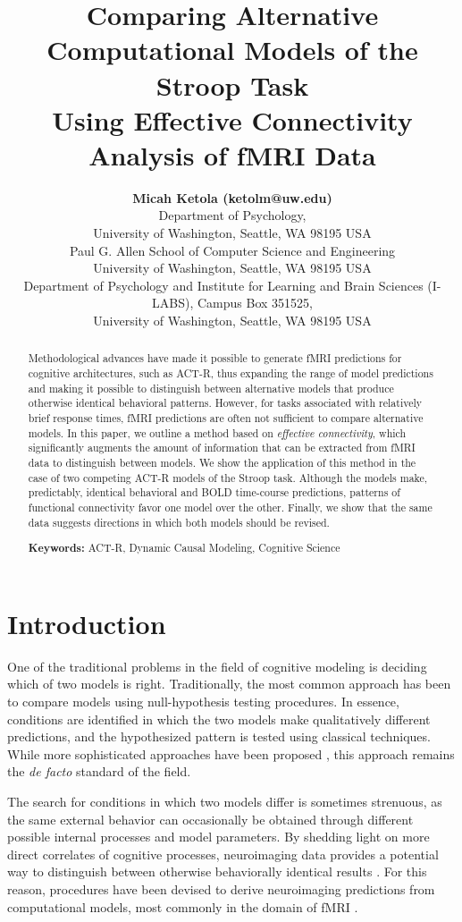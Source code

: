 \documentclass[10pt,letterpaper]{article}
\title{Comparing Alternative Computational Models of the Stroop Task \\Using Effective Connectivity Analysis of fMRI Data}
\author{{\large \bf Micah Ketola (ketolm@uw.edu)} \\
  Department of Psychology, \\
  University of Washington, Seattle, WA 98195 USA
  \AND {\large \bf Linxing Preston Jiang (prestonj@cs.washington.edu)} \\
  Paul G. Allen School of Computer Science and Engineering\\
  University of Washington, Seattle, WA 98195 USA 
  \AND {\large \bf Andrea Stocco (stocco@uw.edu)} \\
  Department of Psychology and Institute for Learning and Brain Sciences (I-LABS), Campus Box 351525, \\
  University of Washington, Seattle, WA 98195 USA}
\begin{document}
\maketitle


\begin{abstract}
Methodological advances have made it possible to generate fMRI predictions for cognitive architectures, such as ACT-R, thus expanding the range of model predictions and making it possible to distinguish between alternative models that produce otherwise identical behavioral patterns. However, for tasks associated with relatively brief response times, fMRI predictions are often not sufficient to compare alternative models. In this paper, we outline a method based on {\it effective connectivity}, which significantly augments the amount of information that can be extracted from fMRI data to distinguish between models. We show the application of this method in the case of two competing ACT-R models of the Stroop task. Although the models make, predictably, identical behavioral and BOLD time-course predictions, patterns of functional connectivity favor one model over the other. Finally, we show that the same data suggests directions in which both models should be revised.

\textbf{Keywords:} 
ACT-R, Dynamic Causal Modeling, Cognitive Science
\end{abstract}

\section{Introduction}

One of the traditional problems in the field of cognitive modeling is deciding which of two models is right. Traditionally, the most common approach has been to compare models using null-hypothesis testing procedures. In essence, conditions are identified in which the two models make qualitatively different predictions, and the hypothesized pattern is tested using classical techniques. While more sophisticated approaches have been proposed \cite{Pitt2006}, this approach remains the {\it de facto} standard of the field.

The search for conditions in which two models differ is sometimes strenuous, as the same external behavior can occasionally be obtained through different possible internal processes and model parameters. By shedding light on more direct correlates of cognitive processes, neuroimaging data provides a potential way to distinguish between otherwise behaviorally identical results \cite{Sohn2004}. For this reason, procedures have been devised to derive neuroimaging predictions from computational models, most commonly in the domain of fMRI \cite{Anderson2008}.
\end{document}
